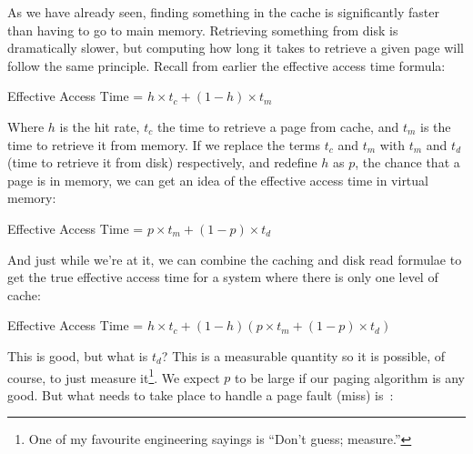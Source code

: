 As we have already seen, finding something in the cache is significantly faster than having to go to main memory. Retrieving something from disk is dramatically slower, but computing how long it takes to retrieve a given page will follow the same principle. Recall from earlier the effective access time formula:

\begin{center}
	Effective Access Time = $ h \times t_{c} + (1 - h) \times t_{m}$
\end{center}

Where $h$ is the hit rate, $t_{c}$ the time to retrieve a page from cache, and $t_{m}$ is the time to retrieve it from memory. If we replace the terms $t_{c}$ and $t_{m}$ with $t_{m}$ and $t_{d}$ (time to retrieve it from disk) respectively, and redefine $h$ as $p$, the chance that a page is in memory, we can get an idea of the effective access time in virtual memory: 

\begin{center}
	Effective Access Time = $ p \times t_{m} + (1 - p) \times t_{d}$
\end{center}

And just while we're at it, we can combine the caching and disk read formulae to get the true effective access time for a system where there is only one level of cache:

\begin{center}
	Effective Access Time = $ h \times t_{c} + (1 - h) ( p \times t_{m} + (1 - p) \times t_{d})$
\end{center}

This is good, but what is $t_{d}$? This is a measurable quantity so it is possible, of course, to just measure it\footnote{One of my favourite engineering sayings is ``Don't guess; measure.''}. We expect $p$ to be large if our paging algorithm is any good. But what needs to take place to handle a page fault (miss) is~\cite{osc}:

